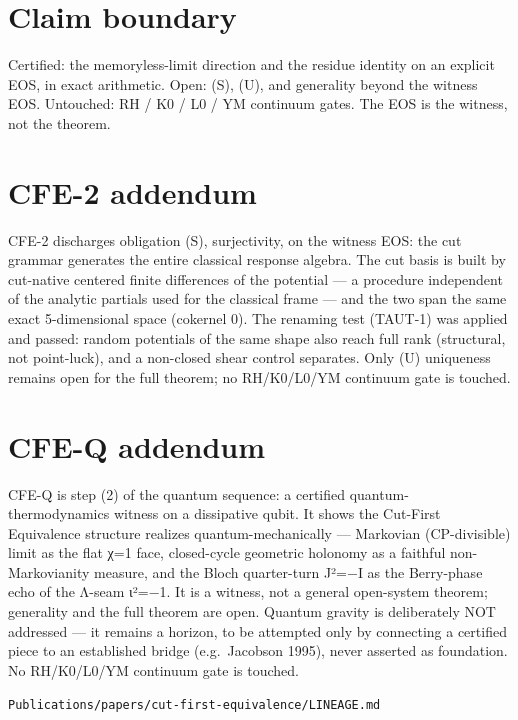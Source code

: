 \hypertarget{claim-boundary}{%
\section{Claim boundary}\label{claim-boundary}}

Certified: the memoryless-limit direction and the residue identity on an
explicit EOS, in exact arithmetic. Open: (S), (U), and generality beyond
the witness EOS. Untouched: RH / K0 / L0 / YM continuum gates. The EOS is
the witness, not the theorem.

\hypertarget{cfe-2-addendum}{%
\section{CFE-2 addendum}\label{cfe-2-addendum}}

CFE-2 discharges obligation (S), surjectivity, on the witness EOS: the
cut grammar generates the entire classical response algebra. The cut
basis is built by cut-native centered finite differences of the
potential --- a procedure independent of the analytic partials used for
the classical frame --- and the two span the same exact 5-dimensional
space (cokernel 0). The renaming test (TAUT-1) was applied and passed:
random potentials of the same shape also reach full rank (structural,
not point-luck), and a non-closed shear control separates. Only (U)
uniqueness remains open for the full theorem; no RH/K0/L0/YM continuum
gate is touched.

\hypertarget{cfe-q-addendum}{%
\section{CFE-Q addendum}\label{cfe-q-addendum}}

CFE-Q is step (2) of the quantum sequence: a certified quantum-
thermodynamics witness on a dissipative qubit. It shows the Cut-First
Equivalence structure realizes quantum-mechanically --- Markovian
(CP-divisible) limit as the flat χ=1 face, closed-cycle geometric
holonomy as a faithful non-Markovianity measure, and the Bloch
quarter-turn J²=−I as the Berry-phase echo of the Λ-seam ι²=−1. It is a
witness, not a general open-system theorem; generality and the full
theorem are open. Quantum gravity is deliberately NOT addressed --- it
remains a horizon, to be attempted only by connecting a certified piece
to an established bridge (e.g.~Jacobson 1995), never asserted as
foundation. No RH/K0/L0/YM continuum gate is touched.

\begin{flushright}\small\texttt{Publications/papers/cut-first-equivalence/LINEAGE.md}\end{flushright}
